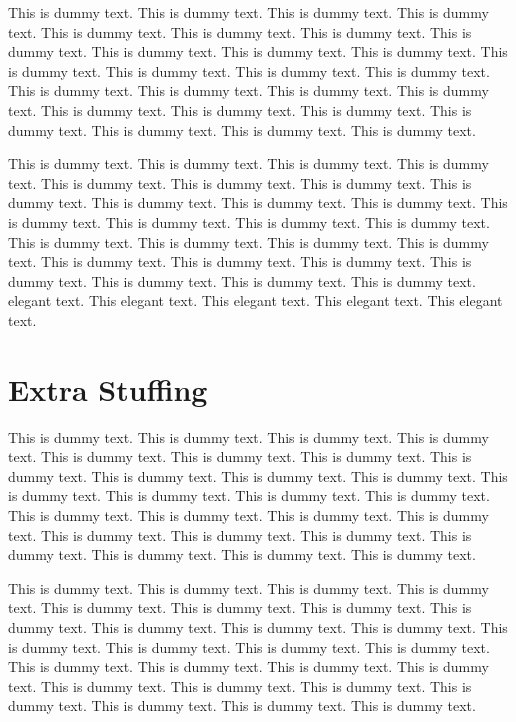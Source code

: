 \documentclass{book}
\begin{document}
This is dummy text. This is dummy text. This is dummy text. This is dummy text. This is dummy text. This is dummy text. This is dummy text. This is dummy text. This is dummy text. This is dummy text. This is dummy text. This is dummy text. This is dummy text. This is dummy text. This is dummy text. This is dummy text. This is dummy text. This is dummy text. This is dummy text. This is dummy text. This is dummy text. This is dummy text. This is dummy text. This is dummy text. This is dummy text. This is dummy text. 

This is dummy text. This is dummy text. This is dummy text. This is dummy text. This is dummy text. This is dummy text. This is dummy text. This is dummy text. This is dummy text. This is dummy text. This is dummy text. This is dummy text. This is dummy text. This is dummy text. This is dummy text. This is dummy text. This is dummy text. This is dummy text. This is dummy text. This is dummy text. This is dummy text. This is dummy text. This is dummy text. This is dummy text. This is dummy text. This is dummy text. elegant text. This elegant text. This elegant text. This elegant text. This elegant text. 

\chapter{Extra Stuffing}\label{Stuffing}
This is dummy text. This is dummy text. This is dummy text. This is dummy text. This is dummy text. This is dummy text. This is dummy text. This is dummy text. This is dummy text. This is dummy text. This is dummy text. This is dummy text. This is dummy text. This is dummy text. This is dummy text. This is dummy text. This is dummy text. This is dummy text. This is dummy text. This is dummy text. This is dummy text. This is dummy text. This is dummy text. This is dummy text. This is dummy text. This is dummy text. 

This is dummy text. This is dummy text. This is dummy text. This is dummy text. This is dummy text. This is dummy text. This is dummy text. This is dummy text. This is dummy text. This is dummy text. This is dummy text. This is dummy text. This is dummy text. This is dummy text. This is dummy text. This is dummy text. This is dummy text. This is dummy text. This is dummy text. This is dummy text. This is dummy text. This is dummy text. This is dummy text. This is dummy text. This is dummy text. This is dummy text. 

\backmatter


\end{document}
